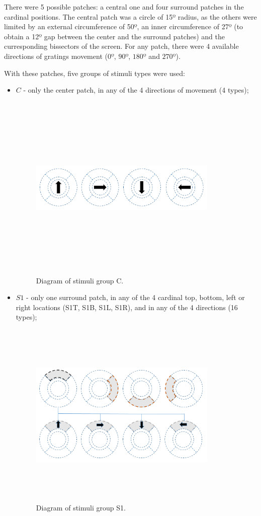 There were 5 possible patches: a central one and four surround patches in the cardinal positions. The central patch was a circle of 15º radius, as the others were limited by an external circumference of 50º, an inner circumference of 27º (to obtain a 12º gap between the center and the surround patches) and the curresponding bissectors of the screen. For any patch, there were 4 available directions of gratings movement ($0º$, $90º$, $180º$ and $270º$).

With these patches, five groups of stimuli types were used:
\begin{itemize}
\item $C$ - only the center patch, in any of the 4 directions of movement (4 types);

\begin{figure}[h]\centering \includegraphics[width=9cm,height=9cm,keepaspectratio]{Figures/4.Chapter/C.PNG} \caption{Diagram of stimuli group C.} \end{figure}

\item $S1$ - only one surround patch, in any of the 4 cardinal top, bottom, left or right locations (S1T, S1B, S1L, S1R), and in any of the 4 directions (16 types);

\begin{figure}[h]\centering \includegraphics[width=9cm,height=9cm,keepaspectratio]{Figures/4.Chapter/S1.PNG} \caption{Diagram of stimuli group S1.} \end{figure}


\end{itemize}
